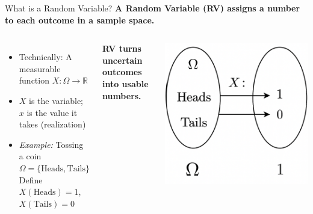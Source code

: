 \documentclass[handout,aspectratio=169]{beamer}
\begin{document}
\begin{frame}{What is a Random Variable?}
	\textbf{A Random Variable (RV) assigns a number to each outcome in a sample space.}
	
	\vspace{1em}
	\begin{columns}
		\begin{itemize}
			\item Technically: A measurable function $X: \Omega \rightarrow \mathbb{R}$
			\item $X$ is the variable; $x$ is the value it takes (realization)
			\item \textit{Example:} Tossing a coin\\
			      \quad $\Omega = \{\text{Heads}, \text{Tails}\}$\\
			      \quad Define $X(\text{Heads}) = 1$, $X(\text{Tails}) = 0$
		\end{itemize}
		
		\vspace{0.5em}
		\textbf{RV turns uncertain outcomes into usable numbers.}
		
		\includegraphics[width=\linewidth]{chapter_figs/01_figs/rv_mapping.png}
	\end{columns}
\end{frame}
\end{document}
